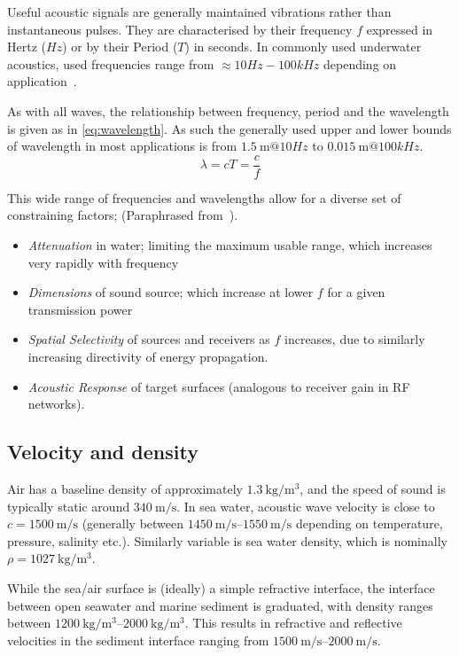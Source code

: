 Useful acoustic signals are generally maintained vibrations rather than instantaneous pulses.
They are characterised by their frequency $f$ expressed in Hertz ($Hz$) or by their Period ($T$) in seconds.
In commonly used underwater acoustics, used frequencies range from $\approx 10Hz-100kHz$ depending on application~\cite{Stojanovic2007}.

As with all waves, the relationship between frequency, period and the wavelength is given as in \eqref{eq:wavelength}. 
As such the generally used upper and lower bounds of wavelength in most applications is from $\SI{1.5}{\meter} @ 10Hz$ to $\SI{0.015}{\meter} @ 100kHz$.
%
\begin{equation}
  \lambda = cT = \frac{c}{f}
  \label{eq:wavelength}
\end{equation}
%

This wide range of frequencies and wavelengths allow for a diverse set of constraining factors; (Paraphrased from~\citet{lurton2010}).

\begin{itemize}
  \item \emph{Attenuation} in water; limiting the maximum usable range, which increases very rapidly with frequency
  \item \emph{Dimensions} of sound source; which increase at lower $f$ for a given transmission power
  \item \emph{Spatial Selectivity} of sources and receivers as $f$ increases, due to similarly increasing directivity of energy propagation.
  \item \emph{Acoustic Response} of target surfaces (analogous to receiver gain in RF networks).
\end{itemize}

\subsection{Velocity and density}\label{sec:aco_vel}

Air has a baseline density of approximately $\SI{1.3}{\kilogram\per\meter\cubed}$, and the speed of sound is typically static around $\SI{340}{\meter\per\second}$.
In sea water, acoustic wave velocity is close to $c=\SI{1500}{\meter\per\second}$ (generally between $\SIrange{1450}{1550}{\meter\per\second}$ depending on temperature, pressure, salinity etc.).
Similarly variable is sea water density, which is nominally $\rho = \SI{1027}{\kilogram\per\meter\cubed}$\cite{Wang2010}.

While the sea/air surface is (ideally) a simple refractive interface, the interface between open seawater and marine sediment is graduated, with density ranges between $\SIrange{1200}{2000}{\kilogram\per\meter\cubed}$. 
This results in refractive and reflective velocities in the sediment interface ranging from $\SIrange{1500}{2000}{\meter\per\second}$\cite{lurton2010}.

